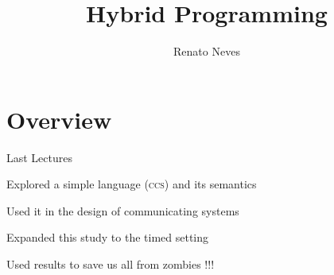 \documentclass{beamer}
\author[Renato Neves]{Renato Neves}
\date{}
\begin{document}
\title{Hybrid Programming}

\frame[plain]{\titlepage}

\section{Overview}

\begin{frame}{Last Lectures}
       
       Explored a simple language (\textsc{ccs}) and its semantics

       \bigskip
       Used it in the design of \alert{communicating} systems

       \bigskip
       Expanded this study to the \alert{timed} setting
       
       \bigskip
       Used results to save us all from zombies !!!

\end{frame}
\end{document}
